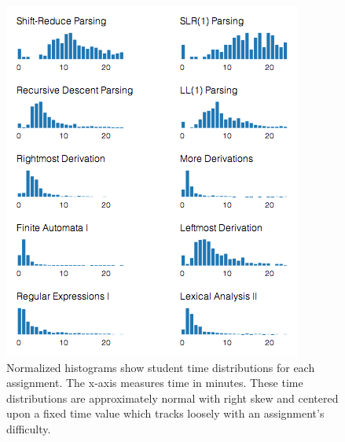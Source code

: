 \documentclass{sigchi}
\begin{document}
\begin{figure}[!h]
\centering
\includegraphics[width=1\columnwidth]{hist_short}
\caption{Normalized histograms show student time distributions for each assignment. The x-axis measures time in minutes. These time distributions are approximately normal with right skew and centered upon a fixed time value which tracks loosely with an assignment's difficulty.}
\label{fig:distributions}
\end{figure}
\end{document}
